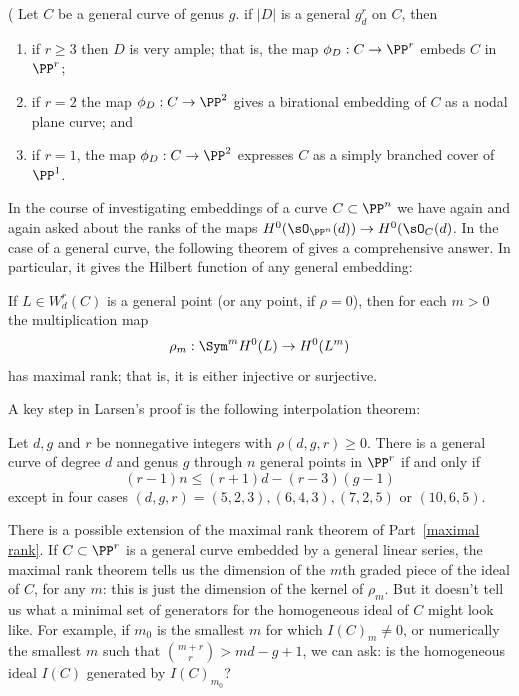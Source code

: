 \begin{theorem}\label{grd omnibus}(\cite[Proposition 5.4]{Eisenbud-Harris83}
Let $C$ be a general curve of genus $g$.
 if $|D|$ is a general $g^r_d$ on $C$, then

 \begin{enumerate}
\item if $r \geq 3$ then $D$ is very ample; that is, the map $\phi_D : C \to \PP^r$   embeds $C$ in $\PP^r$;
\item if $r=2$ the map $\phi_D : C \to \PP^2$ gives a birational embedding of $C$ as a nodal plane curve; and 
\item if $r=1$, the map $\phi_D : C \to \PP^2$ expresses $C$ as a simply branched cover of $\PP^1$.
\end{enumerate}
\end{theorem}



In the course of investigating embeddings of a curve $C\subset \PP^n$ we have again and again
asked about the ranks of the maps $H^0(\sO_{\PP^n}(d)) \to H^0(\sO_C(d)$. In the case of
a general curve, the following theorem of \cite{ELarson2018} gives a comprehensive answer. In particular, it gives
 the Hilbert function of any general embedding:
 
\begin{theorem} \label{maximal rank}
If $L \in W^r_d(C)$ is a general point (or any point, if $\rho = 0$), then for each $m > 0$ the multiplication map
$$
\rho_m : \Sym^m H^0(L) \to H^0(L^m)
$$
has maximal rank; that is, it is either injective or surjective.
\end{theorem}

A key step in Larsen's proof is the following interpolation theorem:

\begin{theorem}\cite{Larson-Vogt}
Let $d, g$ and $r$
be nonnegative integers with $\rho(d, g, r) \geq 0$. There is a general curve of degree $d$ and genus $g$ through $n$ general
points in $\PP^r$
if and only if
$$
(r-1)n \leq (r + 1)d-(r-3)(g-1)
$$
except in four cases $(d, g, r) = (5, 2, 3),(6, 4, 3),(7, 2, 5)$ or $(10, 6, 5)$.

 \end{theorem}
 
There is a possible extension of the maximal rank theorem of Part~\ref{maximal rank}. If $C \subset \PP^r$ is a general curve embedded by a general linear series, the maximal rank theorem tells us the dimension of the $m$th graded piece of the ideal of $C$, for any $m$: this is just the dimension of the kernel of $\rho_m$. But it doesn't tell us what a minimal set of generators for the homogeneous ideal of $C$ might look like. For example, if $m_0$ is the smallest $m$ for which $I(C)_m \neq 0$, or numerically the smallest $m$ such that $\binom{m+r}{r} > md-g+1$, we can ask: is the homogeneous ideal $I(C)$ generated by $I(C)_{m_0}$?

